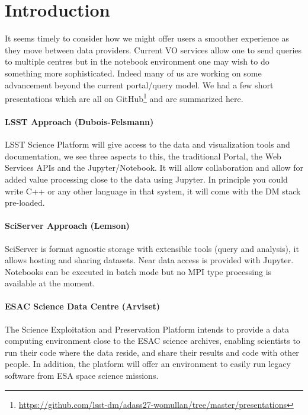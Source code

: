 \documentclass[11pt,twoside]{article}
\begin{document}
\section{Introduction}

It seems timely to consider how we might offer users a smoother experience as they move between data providers.
Current VO services allow one to send queries to multiple centres but in the notebook environment one may wish to do something more sophisticated.
Indeed many of us are working on some advancement beyond the current portal/query model.
We had a few short presentations which are all on GitHub\footnote{\url{https://github.com/lsst-dm/adass27-womullan/tree/master/presentations}} and are summarized here.

\paragraph*{LSST Approach (Dubois-Felsmann)} LSST \citep{2008arXiv0805.2366I} Science Platform \citep{LSE-319} will give access to the data and visualization tools and documentation, we see three aspects to this, the traditional Portal, the Web Services APIs and the Jupyter/Notebook.
It will allow collaboration and allow for added value processing close to the data using Jupyter. In principle you could write C++ or any other language in that system, it will come with the DM stack \citep{O3-1_adassxxv} pre-loaded.

\paragraph*{SciServer Approach (Lemson)} SciServer is format agnostic storage with extensible tools (query and analysis), it allows hosting and sharing datasets. Near data access is provided with Jupyter. Notebooks can be executed in batch mode but no MPI type processing is available at the moment.

\paragraph*{ESAC Science Data Centre (Arviset)} The Science Exploitation and Preservation Platform intends to provide a data computing environment close to the ESAC science archives, enabling scientists to run their code where the data reside, and share their results and code with other people. In addition, the platform will offer an environment to easily run legacy software from ESA space science missions.
\end{document}
